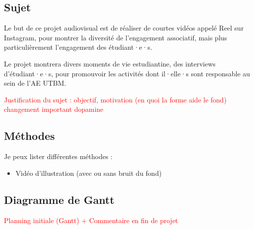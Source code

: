 
\subsection{Sujet}\label{subsec:sujet}

Le but de ce projet audiovisual est de réaliser de courtes vidéos appelé Reel sur Instagram, pour montrer la diversité de l'engagement associatif, mais plus particulièrement l'engagement des étudiant·e·s.

Le projet montrera divers moments de vie estudiantine, des interviews d'étudiant·e·s, pour promouvoir les activités dont il·elle·s sont responsable au sein de l'AE UTBM.

\textcolor{red}{Justification du sujet : objectif, motivation (en quoi la forme aide le fond) changement important dopamine}


\subsection{Méthodes}\label{subsec:methodes}

Je peux lister différentes méthodes :
\begin{itemize}
    \item Vidéo d'illustration (avec ou sans bruit du fond)
\end{itemize}

\subsection{Diagramme de Gantt}\label{subsec:diagramme-de-gantt}


\textcolor{red}{Planning initiale  (Gantt) + Commentaire en fin de projet}




